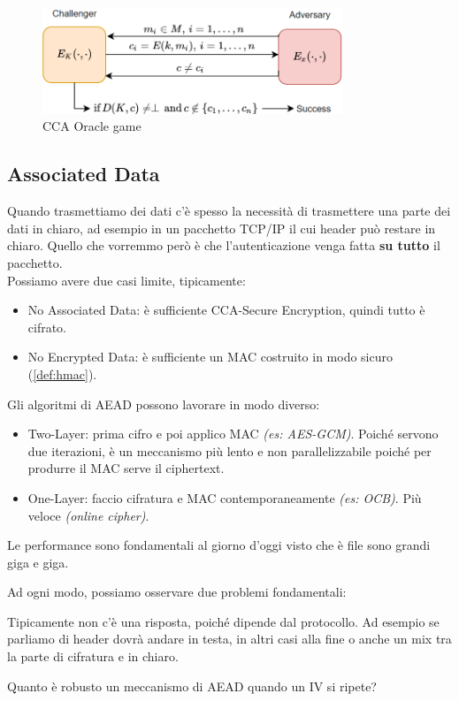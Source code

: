 \begin{figure}[H]
    \centering
    \includegraphics[width=0.8\textwidth]{image/cca.png}
    \caption{CCA Oracle game}
    \label{fig:ciphertextoracle}
\end{figure}
\subsection{Associated Data}
Quando trasmettiamo dei dati c'è spesso la necessità di trasmettere una parte dei dati in chiaro, ad esempio in un pacchetto TCP/IP il cui header può restare in chiaro. Quello che vorremmo però è che l'autenticazione venga fatta \textbf{su tutto} il pacchetto.\\
Possiamo avere due casi limite, tipicamente:
\begin{itemize}
    \item No Associated Data: è sufficiente CCA-Secure Encryption, quindi tutto è cifrato.
    \item No Encrypted Data: è sufficiente un MAC costruito in modo sicuro (\cref{def:hmac}). 
\end{itemize}
Gli algoritmi di AEAD possono lavorare in modo diverso:
\begin{itemize}
    \item Two-Layer: prima cifro e poi applico MAC \textit{(es: AES-GCM)}.  Poiché servono due iterazioni, è un meccanismo più lento e non parallelizzabile poiché per produrre il MAC serve il ciphertext.
    \item One-Layer: faccio cifratura e MAC contemporaneamente \textit{(es: OCB)}. Più veloce \textit{(online cipher)}.
\end{itemize}
\begin{remark}
Le performance sono fondamentali al giorno d'oggi visto che è file sono grandi giga e giga. 
\end{remark}
Ad ogni modo, possiamo osservare due problemi fondamentali:
\begin{problem}Tipicamente non c'è una risposta, poiché dipende dal protocollo. Ad esempio se parliamo di header dovrà andare in testa, in altri casi alla fine o anche un mix tra la parte di cifratura e in chiaro. 
\end{problem}
\begin{problem}
Quanto è robusto un meccanismo di AEAD quando un IV si ripete?
\end{problem}
\vspace{-5mm}
